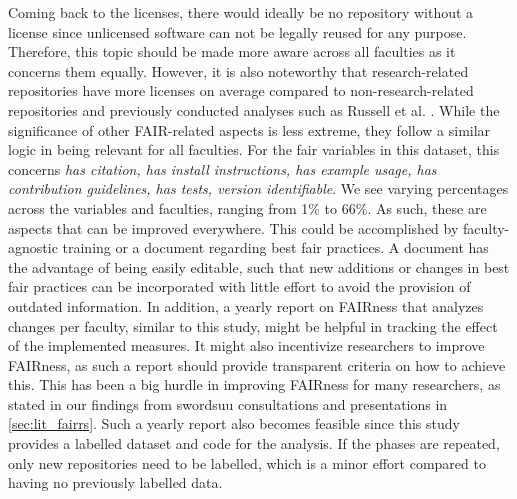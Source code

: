 Coming back to the licenses, there would ideally be no repository without a license since unlicensed software can not be legally reused for any purpose. Therefore, this topic should be made more aware across all faculties as it concerns them equally. However, it is also noteworthy that research-related repositories have more licenses on average compared to non-research-related repositories and previously conducted analyses such as Russell et al. \cite{russell_large-scale_2018}. 
While the significance of other FAIR-related aspects is less extreme, they follow a similar logic in being relevant for all faculties. For the \acrshort{fair} variables in this dataset, this concerns \textit{has citation, has install instructions, has example usage, has contribution guidelines, has tests, version identifiable}. We see varying percentages across the variables and faculties, ranging from 1\% to 66\%. As such, these are aspects that can be improved everywhere. This could be accomplished by faculty-agnostic training or a document regarding best \acrshort{fair} practices. A document has the advantage of being easily editable, such that new additions or changes in best \acrshort{fair} practices can be incorporated with little effort to avoid the provision of outdated information. 
In addition, a yearly report on FAIRness that analyzes changes per faculty, similar to this study, might be helpful in tracking the effect of the implemented measures. It might also incentivize researchers to improve FAIRness, as such a report should provide transparent criteria on how to achieve this. This has been a big hurdle in improving FAIRness for many researchers, as stated in our findings from \acrshort{swordsuu} consultations and presentations in \autoref{sec:lit_fairrs}. Such a yearly report also becomes feasible since this study provides a labelled dataset and code for the analysis. If the phases are repeated, only new repositories need to be labelled, which is a minor effort compared to having no previously labelled data. 






